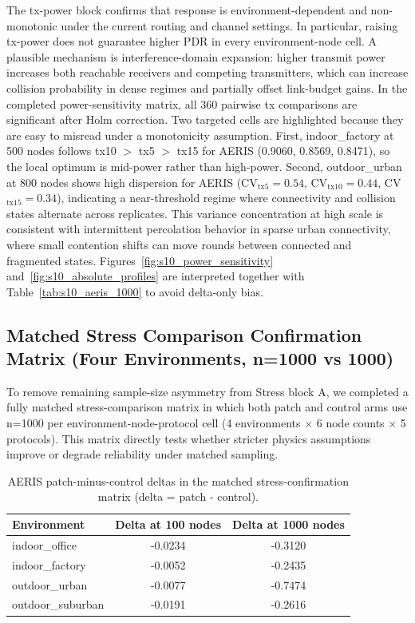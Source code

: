 ﻿\documentclass[sensors,article,submit,moreauthors,pdftex]{Definitions/mdpi}
\begin{document}
The tx-power block confirms that response is environment-dependent and non-monotonic under the current routing and channel settings. In particular, raising tx-power does not guarantee higher PDR in every environment-node cell. A plausible mechanism is interference-domain expansion: higher transmit power increases both reachable receivers and competing transmitters, which can increase collision probability in dense regimes and partially offset link-budget gains. In the completed power-sensitivity matrix, all 360 pairwise tx comparisons are significant after Holm correction.
Two targeted cells are highlighted because they are easy to misread under a monotonicity assumption. First, indoor\_factory at 500 nodes follows tx10 $>$ tx5 $>$ tx15 for AERIS (0.9060, 0.8569, 0.8471), so the local optimum is mid-power rather than high-power. Second, outdoor\_urban at 800 nodes shows high dispersion for AERIS (CV$_{\text{tx5}}=0.54$, CV$_{\text{tx10}}=0.44$, CV$_{\text{tx15}}=0.34$), indicating a near-threshold regime where connectivity and collision states alternate across replicates. This variance concentration at high scale is consistent with intermittent percolation behavior in sparse urban connectivity, where small contention shifts can move rounds between connected and fragmented states.
Figures~\ref{fig:s10_power_sensitivity} and~\ref{fig:s10_absolute_profiles} are interpreted together with Table~\ref{tab:s10_aeris_1000} to avoid delta-only bias.

\subsection{Matched Stress Comparison Confirmation Matrix (Four Environments, n=1000 vs 1000)}
To remove remaining sample-size asymmetry from Stress block A, we completed a fully matched stress-comparison matrix in which both patch and control arms use n=1000 per environment-node-protocol cell (4 environments $\times$ 6 node counts $\times$ 5 protocols). This matrix directly tests whether stricter physics assumptions improve or degrade reliability under matched sampling.

\begin{table}[H]
\caption{AERIS patch-minus-control deltas in the matched stress-confirmation matrix (delta = patch - control).}
\label{tab:s11_aeris_delta}
\centering
\begin{tabular}{lcc}
\toprule
Environment & Delta at 100 nodes & Delta at 1000 nodes \\
\midrule
indoor\_office    & -0.0234 & -0.3120 \\
indoor\_factory   & -0.0052 & -0.2435 \\
outdoor\_urban    & -0.0077 & -0.7474 \\
outdoor\_suburban & -0.0191 & -0.2616 \\
\bottomrule
\end{tabular}
\end{table}
\end{document}
